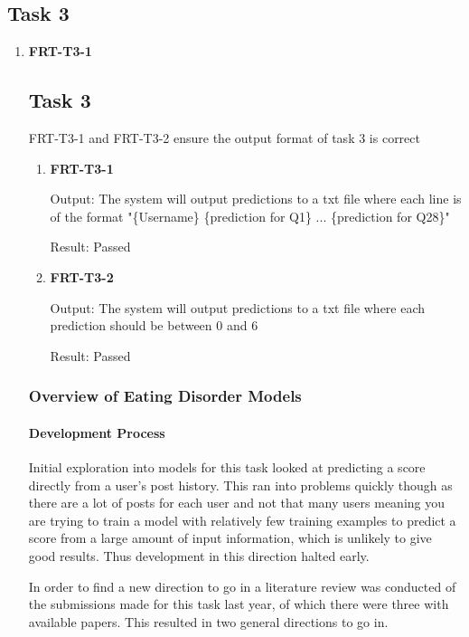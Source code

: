 \documentclass[12pt, titlepage]{article}
\begin{document}
\subsection{Task 3}
\begin{enumerate}
\item \textbf{FRT-T3-1}

 \subsection{Task 3}

FRT-T3-1 and FRT-T3-2 ensure the output format of task 3 is correct
 
 \begin{enumerate}
 
 \item \textbf{FRT-T3-1}

Output: The system will output predictions to a txt file where each line is of the format "\{Username\} \{prediction for Q1\} ... \{prediction for Q28\}"

Result: Passed


\item \textbf{FRT-T3-2}

Output: The system will output predictions to a txt file where each prediction should be between 0 and 6

Result: Passed

\end{enumerate}

\subsubsection{Overview of Eating Disorder Models}

\paragraph{Development Process\newline}

Initial exploration into models for this task looked at predicting a score directly from a user's post history. This ran into problems quickly though as there are a lot of posts for each user and not that many users meaning you are trying to train a model with relatively few training examples to predict a score from a large amount of input information, which is unlikely to give good results. Thus development in this direction halted early.

In order to find a new direction to go in a literature review was conducted of the submissions made for this task last year, of which there were three with available papers. This resulted in two general directions to go in.


\end{enumerate}
\end{document}

